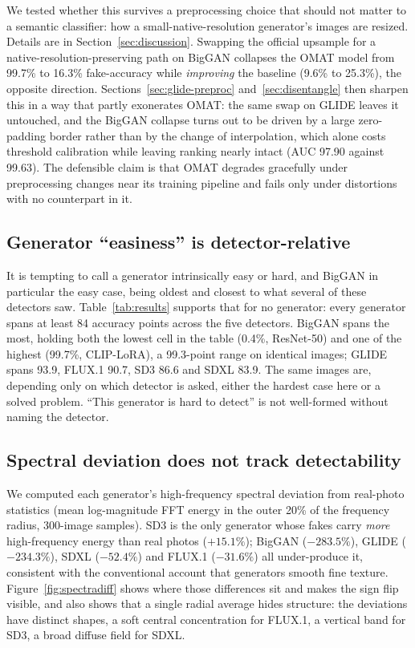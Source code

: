 \documentclass[3p,times,procedia]{elsarticle}
\begin{document}
We tested whether this survives a preprocessing choice that should not
matter to a semantic classifier: how a small-native-resolution generator's
images are resized. Details are in Section~\ref{sec:discussion}. Swapping
the official upsample for a native-resolution-preserving path on BigGAN
collapses the OMAT model from 99.7\% to 16.3\% fake-accuracy while
\emph{improving} the baseline (9.6\% to 25.3\%), the opposite direction.
Sections~\ref{sec:glide-preproc} and~\ref{sec:disentangle} then sharpen
this in a way that partly exonerates OMAT: the same swap on GLIDE leaves it
untouched, and the BigGAN collapse turns out to be driven by a large
zero-padding border rather than by the change of interpolation, which
alone costs threshold calibration while leaving ranking nearly intact (AUC
97.90 against 99.63). The defensible claim is that OMAT degrades gracefully
under preprocessing changes near its training pipeline and fails only under
distortions with no counterpart in it.

\subsection{Generator ``easiness'' is detector-relative}
\label{sec:finding3}

It is tempting to call a generator intrinsically easy or hard, and BigGAN
in particular the easy case, being oldest and closest to what several of
these detectors saw. Table~\ref{tab:results} supports that for no
generator: every generator spans at least 84 accuracy points across the
five detectors. BigGAN spans the most, holding both the lowest cell in the
table (0.4\%, ResNet-50) and one of the highest (99.7\%, CLIP-LoRA), a
99.3-point range on identical images; GLIDE spans 93.9, FLUX.1 90.7, SD3
86.6 and SDXL 83.9. The same images are, depending only on which detector
is asked, either the hardest case here or a solved problem. ``This
generator is hard to detect'' is not well-formed without naming the
detector.

\subsection{Spectral deviation does not track detectability}
\label{sec:spectral}

We computed each generator's high-frequency spectral deviation from
real-photo statistics (mean log-magnitude FFT energy in the outer 20\% of
the frequency radius, 300-image samples). SD3 is the only generator whose
fakes carry \emph{more} high-frequency energy than real photos
($+15.1\%$); BigGAN ($-283.5\%$), GLIDE ($-234.3\%$), SDXL ($-52.4\%$) and
FLUX.1 ($-31.6\%$) all under-produce it, consistent with the conventional
account that generators smooth fine texture.
Figure~\ref{fig:spectradiff} shows where those differences sit and makes
the sign flip visible, and also shows that a single radial average hides
structure: the deviations have distinct shapes, a soft central
concentration for FLUX.1, a vertical band for SD3, a broad diffuse field
for SDXL.
\end{document}
